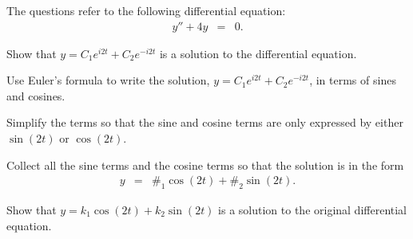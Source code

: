   \begin{problem}

  \item The questions refer to the following differential equation:
    \begin{eqnarray*}
      y'' + 4y & = & 0.
    \end{eqnarray*}

    \begin{subproblem}
      \item Show that $y=C_1 e^{i2t} + C_2 e^{-i2t}$ is a solution to
        the differential equation.
        \vfill

      \item Use Euler's formula to write the solution, $y=C_1 e^{i2t}
        + C_2 e^{-i2t}$, in terms of sines and cosines.
        \vfill

        \clearpage

      \item Simplify the terms so that the sine and cosine terms are
        only expressed by either $\sin(2t)$ or $\cos(2t)$.

        \vfill

      \item Collect all the sine terms and the cosine terms so that
        the solution is in the form
        \begin{eqnarray*}
          y & = & \#_1 \cos(2t) + \#_2 \sin(2t).
        \end{eqnarray*}
        \vfill

      \item Show that $y=k_1 \cos(2t) + k_2 \sin(2t)$ is a solution to
        the original differential equation.
        \vfill
        

    \end{subproblem}


\end{problem}
